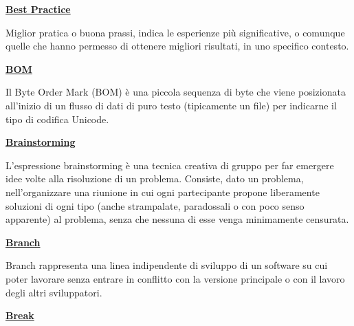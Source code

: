 \vspace*{2\bigskipamount}


\begin{addmargin}[0em]{0em}
	\textbf{\underline{Best Practice}} 
\end{addmargin}
	
\medskip
\begin{addmargin}[5em]{1em}
Miglior pratica o buona prassi, indica le esperienze più significative, o comunque quelle che hanno permesso di ottenere migliori risultati, in uno specifico contesto.
\end{addmargin}

\bigskip
\begin{addmargin}[0em]{0em}
	\textbf{\underline{BOM}} 
\end{addmargin}
	
\medskip
\begin{addmargin}[5em]{1em}
Il Byte Order Mark (BOM) è una piccola sequenza di byte che viene posizionata
all'inizio di un flusso di dati di puro testo (tipicamente un file) per indicarne il
tipo di codifica Unicode.
\end{addmargin}

\bigskip
\begin{addmargin}[0em]{0em}	
	\textbf{\underline{Brainstorming}}
\end{addmargin}
	
\medskip
\begin{addmargin}[5em]{1em}	
L'espressione brainstorming è una tecnica creativa di gruppo per far emergere idee volte alla risoluzione di un problema. Consiste, dato un problema, nell'organizzare una riunione in cui ogni partecipante propone liberamente soluzioni di ogni tipo (anche strampalate, paradossali o con poco senso apparente) al problema, senza che nessuna di esse venga minimamente censurata.
\end{addmargin}

\bigskip
\begin{addmargin}[0em]{0em}
	\textbf{\underline{Branch}} 
\end{addmargin}
	
\medskip
\begin{addmargin}[5em]{1em}
Branch rappresenta una linea indipendente di sviluppo di un software su cui poter lavorare 
senza entrare in conflitto con la versione principale o con il lavoro degli altri sviluppatori.
\end{addmargin}

\bigskip
\begin{addmargin}[0em]{0em}	
	\textbf{\underline{Break}}
\end{addmargin}
	
